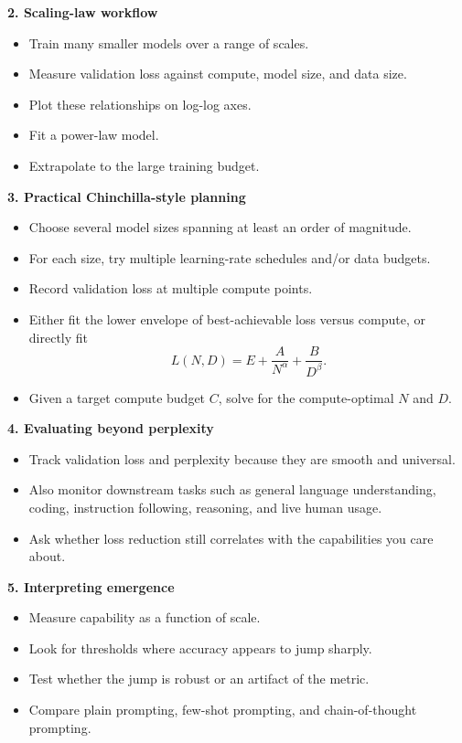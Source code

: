 \documentclass[11pt]{article}
\begin{document}
\textbf{2. Scaling-law workflow}
\begin{itemize}
    \item Train many smaller models over a range of scales.
    \item Measure validation loss against compute, model size, and data size.
    \item Plot these relationships on log-log axes.
    \item Fit a power-law model.
    \item Extrapolate to the large training budget.
\end{itemize}

\textbf{3. Practical Chinchilla-style planning}
\begin{itemize}
    \item Choose several model sizes spanning at least an order of magnitude.
    \item For each size, try multiple learning-rate schedules and/or data budgets.
    \item Record validation loss at multiple compute points.
    \item Either fit the lower envelope of best-achievable loss versus compute, or directly fit
    \[
    L(N,D)=E+\frac{A}{N^\alpha}+\frac{B}{D^\beta}.
    \]
    \item Given a target compute budget \(C\), solve for the compute-optimal \(N\) and \(D\).
\end{itemize}

\textbf{4. Evaluating beyond perplexity}
\begin{itemize}
    \item Track validation loss and perplexity because they are smooth and universal.
    \item Also monitor downstream tasks such as general language understanding, coding, instruction following, reasoning, and live human usage.
    \item Ask whether loss reduction still correlates with the capabilities you care about.
\end{itemize}

\textbf{5. Interpreting emergence}
\begin{itemize}
    \item Measure capability as a function of scale.
    \item Look for thresholds where accuracy appears to jump sharply.
    \item Test whether the jump is robust or an artifact of the metric.
    \item Compare plain prompting, few-shot prompting, and chain-of-thought prompting.
\end{itemize}
\end{document}
